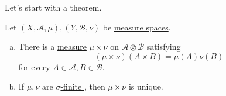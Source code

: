 Let's start with a theorem.
\begin{theorem}
	Let \((X, \mathcal{A} , \mu ), (Y, \mathcal{B} , \nu )\) be \hyperref[def:measure-space]{measure spaces}.
	\begin{enumerate}[(a)]
		\item There is a \hyperref[def:measure]{measure} \(\mu \times \nu \) on \(\mathcal{A} \otimes \mathcal{B} \) satisfying
		      \[
			      (\mu \times \nu )(A\times B) = \mu (A)\nu (B)
		      \]
		      for every \(A\in \mathcal{A} , B\in \mathcal{B} \).
		\item If \(\mu , \nu \) are \hyperref[def:sigma-finite-measure]{\(\sigma\)-finite }, then \(\mu \times \nu \) is unique.
	\end{enumerate}
\end{theorem}
